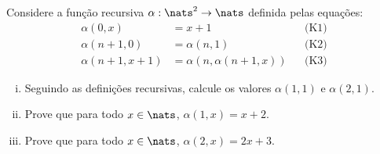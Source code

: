 \begin{exercise}
	Considere a função recursiva $\alpha : \nats^2 \to \nats$ definida pelas equações:
	$$
		\begin{aligned}
			\alpha (0, x) &= x + 1 &&\text{(K1)}\\
			\alpha (n + 1, 0) &= \alpha (n, 1) &&\text{(K2)}\\
			\alpha (n + 1, x + 1) &= \alpha (n, \alpha (n + 1, x)) &&\text{(K3)}
		\end{aligned}
	$$
	\begin{enumerate}[(i)]
		\item Seguindo as definições recursivas, calcule os valores $\alpha (1, 1)$ e $\alpha (2, 1)$.
		\item Prove que para todo $x \in \nats$, $\alpha (1, x) = x + 2$.
		\item Prove que para todo $x \in \nats$, $\alpha (2, x) = 2x + 3$.
	\end{enumerate}
\end{exercise}
